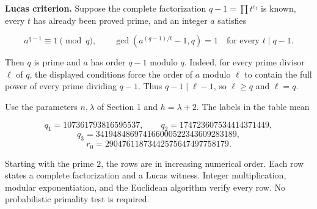 \documentclass[
  11pt,
  a4paper,
]{article}
\begin{document}
\textbf{Lucas criterion.} Suppose the complete factorization
\(q-1=\prod t^{e_t}\) is known, every \(t\) has already been proved
prime, and an integer \(a\) satisfies

\[
a^{q-1}\equiv1\pmod q,\qquad
\gcd(a^{(q-1)/t}-1,q)=1\quad\text{for every }t\mid q-1.
\]

Then \(q\) is prime and \(a\) has order \(q-1\) modulo \(q\). Indeed,
for every prime divisor \(\ell\) of \(q\), the displayed conditions
force the order of \(a\) modulo \(\ell\) to contain the full power of
every prime dividing \(q-1\). Thus \(q-1\mid\ell-1\), so \(\ell\geq q\)
and \(\ell=q\).

Use the parameters \(n,\lambda\) of Section 1 and \(h=\lambda+2\). The
labels in the table mean

\[
q_1=107361793816595537,\qquad q_2=174723607534414371449,
\] \[
q_3=341948486974166000522343609283189,
\] \[
r_0=29047611873442575647497758179.
\]

Starting with the prime \(2\), the rows are in increasing numerical
order. Each row states a complete factorization and a Lucas witness.
Integer multiplication, modular exponentiation, and the Euclidean
algorithm verify every row. No probabilistic primality test is required.
\end{document}
